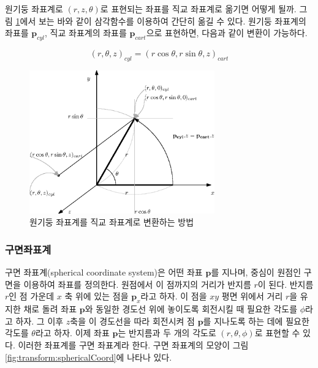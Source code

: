 원기둥 좌표계로 $(r, z, \theta)$로 표현되는 좌표를 직교 좌표계로 옮기면 어떻게 될까.
그림 \ref{fig:transform:cyl2Cartesian}에서 보는 바와 같이 삼각함수를 이용하여 간단히 옮길 수 있다.
원기둥 좌표계의 좌표를 $\mathbf p_{cyl}$, 직교 좌표계의 좌표를 $\mathbf p_{cart}$으로 표현하면,
다음과 같이 변환이 가능하다.

$$(r, \theta, z)_{cyl} = ( r \cos \theta , r \sin \theta, z)_{cart}$$

\begin{figure}[h!]
  \centering
    \includegraphics[width=8cm]{Math_transform/cyl2Cartesian.eps}
    \caption{원기둥 좌표계를 직교 좌표계로 변환하는 방법}
    \label{fig:transform:cyl2Cartesian}
\end{figure}

\subsubsection{구면좌표계}

구면 좌표계(spherical coordinate system)은 어떤 좌표 $\mathbf p$를 지나며, 중심이 원점인 구면을 이용하여 좌표를 정의한다.
원점에서 이 점까지의 거리가 반지름 $r$이 된다.
반지름 $r$인 점 가운데  $x$ 축 위에 있는 점을 $\mathbf p_x$라고 하자. 이 점을 $xy$ 평면 위에서 거리 $r$을 유지한 채로 돌려
좌표 $\mathbf p$와 동일한 경도선 위에 놓이도록 회전시킬 때 필요한 각도를 $\phi$라고 하자. 그 이후 $z$축을 이 경도선을 따라 
회전시켜 점 $\mathbf p$를 지나도록 하는 데에 필요한 각도를 $\theta$라고 하자.
이제 좌표 $\mathbf p$는 반지름과 두 개의 각도로 $(r, \theta, \phi)$로 표현할 수 있다. 이러한 좌표계를 구면 좌표계라 한다.
구면 좌표계의 모양이 그림 \ref{fig:transform:sphericalCoord}에 나타나 있다.

